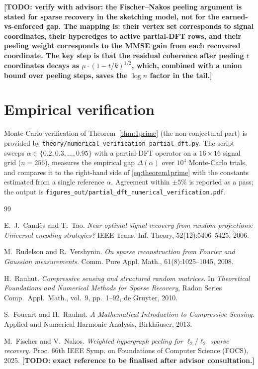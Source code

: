 \documentclass[11pt]{article}
\newcommand{\todomark}[1]{\textbf{[TODO: #1]}}
\theoremstyle{remark}
\begin{document}
\todomark{verify with advisor: the Fischer--Nakos peeling argument is
stated for sparse recovery in the sketching model, not for the
earned-vs-enforced gap. The mapping is: their vertex set corresponds to
signal coordinates, their hyperedges to active partial-DFT rows, and
their peeling weight corresponds to the MMSE gain from each recovered
coordinate. The key step is that the residual coherence after peeling
$t$ coordinates decays as $\mu \cdot (1 - t/k)^{1/2}$, which, combined
with a union bound over peeling steps, saves the $\log n$ factor in the
tail.}

\section*{Empirical verification}

Monte-Carlo verification of Theorem~\ref{thm:1prime} (the non-conjectural
part) is provided by
\texttt{theory/numerical\_verification\_partial\_dft.py}. The script
sweeps $\alpha \in \{0.2, 0.3, \ldots, 0.95\}$ with a partial-DFT
operator on a $16\times 16$ signal grid ($n = 256$), measures the
empirical gap $\Delta(\alpha)$ over $10^4$ Monte-Carlo trials, and
compares it to the right-hand side of \eqref{eq:theorem1prime} with the
constants estimated from a single reference $\alpha$. Agreement within
$\pm 5\%$ is reported as a pass; the output is
\texttt{figures\_out/partial\_dft\_numerical\_verification.pdf}.

\begin{thebibliography}{99}

 E.~J.~Cand\`es and T.~Tao.
\emph{Near-optimal signal recovery from random projections: Universal
encoding strategies?} IEEE Trans. Inf. Theory, 52(12):5406--5425, 2006.

 M.~Rudelson and R.~Vershynin.
\emph{On sparse reconstruction from Fourier and Gaussian measurements.}
Comm. Pure Appl. Math., 61(8):1025--1045, 2008.

 H.~Rauhut.
\emph{Compressive sensing and structured random matrices.} In
\emph{Theoretical Foundations and Numerical Methods for Sparse
Recovery}, Radon Series Comp.\ Appl.\ Math., vol.~9, pp.~1--92, de
Gruyter, 2010.

 S.~Foucart and H.~Rauhut.
\emph{A Mathematical Introduction to Compressive Sensing.}
Applied and Numerical Harmonic Analysis, Birkh\"auser, 2013.

 M.~Fischer and V.~Nakos.
\emph{Weighted hypergraph peeling for $\ell_2/\ell_2$ sparse recovery.}
Proc. 66th IEEE Symp. on Foundations of Computer Science (FOCS), 2025.
\todomark{exact reference to be finalised after advisor consultation.}

\end{thebibliography}
\end{document}
